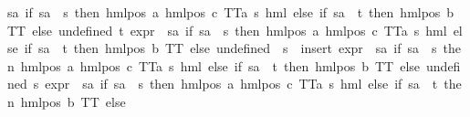 \begin{isabellebody}
{\isacharparenleft}{\kern0pt}{\isasymlambda}sa{\isachardot}{\kern0pt}\ if\ sa\ {\isacharequal}{\kern0pt}\ s\ then\ hml{\isacharunderscore}{\kern0pt}pos\ a\ {\isacharparenleft}{\kern0pt}hml{\isacharunderscore}{\kern0pt}pos\ c\ {\isacharparenleft}{\kern0pt}TT{\isacharcolon}{\kern0pt}{\isacharcolon}{\kern0pt}{\isacharparenleft}{\kern0pt}{\isacharprime}{\kern0pt}a{\isacharcomma}{\kern0pt}\ {\isacharprime}{\kern0pt}s{\isacharparenright}{\kern0pt}\ hml{\isacharparenright}{\kern0pt}{\isacharparenright}{\kern0pt}\ else\ if\ sa\ {\isacharequal}{\kern0pt}\ t\ then\ hml{\isacharunderscore}{\kern0pt}pos\ b\ TT\ else\ undefined{\isacharparenright}{\kern0pt}{\isacharparenright}{\kern0pt}\ t{\isacharparenright}{\kern0pt}\ {\isacharparenleft}{\kern0pt}{\isacharparenleft}{\kern0pt}expr{\isacharunderscore}{\kern0pt}{}\ {\isasymcirc}\ {\isacharparenleft}{\kern0pt}{\isasymlambda}sa{\isachardot}{\kern0pt}\ if\ sa\ {\isacharequal}{\kern0pt}\ s\ then\ hml{\isacharunderscore}{\kern0pt}pos\ a\ {\isacharparenleft}{\kern0pt}hml{\isacharunderscore}{\kern0pt}pos\ c\ {\isacharparenleft}{\kern0pt}TT{\isacharcolon}{\kern0pt}{\isacharcolon}{\kern0pt}{\isacharparenleft}{\kern0pt}{\isacharprime}{\kern0pt}a{\isacharcomma}{\kern0pt}\ {\isacharprime}{\kern0pt}s{\isacharparenright}{\kern0pt}\ hml{\isacharparenright}{\kern0pt}{\isacharparenright}{\kern0pt}\ else\ if\ sa\ {\isacharequal}{\kern0pt}\ t\ then\ hml{\isacharunderscore}{\kern0pt}pos\ b\ TT\ else\ undefined{\isacharparenright}{\kern0pt}{\isacharparenright}{\kern0pt}\ {\isacharbackquote}{\kern0pt}\ {\isacharbraceleft}{\kern0pt}s{\isacharbraceright}{\kern0pt}{\isacharparenright}{\kern0pt}\ {\isasymunion}\ insert\ {\isacharparenleft}{\kern0pt}{\isacharparenleft}{\kern0pt}expr{\isacharunderscore}{\kern0pt}{}\ {\isasymcirc}\ {\isacharparenleft}{\kern0pt}{\isasymlambda}sa{\isachardot}{\kern0pt}\ if\ sa\ {\isacharequal}{\kern0pt}\ s\ then\ hml{\isacharunderscore}{\kern0pt}pos\ a\ {\isacharparenleft}{\kern0pt}hml{\isacharunderscore}{\kern0pt}pos\ c\ {\isacharparenleft}{\kern0pt}TT{\isacharcolon}{\kern0pt}{\isacharcolon}{\kern0pt}{\isacharparenleft}{\kern0pt}{\isacharprime}{\kern0pt}a{\isacharcomma}{\kern0pt}\ {\isacharprime}{\kern0pt}s{\isacharparenright}{\kern0pt}\ hml{\isacharparenright}{\kern0pt}{\isacharparenright}{\kern0pt}\ else\ if\ sa\ {\isacharequal}{\kern0pt}\ t\ then\ hml{\isacharunderscore}{\kern0pt}pos\ b\ TT\ else\ undefined{\isacharparenright}{\kern0pt}{\isacharparenright}{\kern0pt}\ s{\isacharparenright}{\kern0pt}\ {\isacharparenleft}{\kern0pt}{\isacharparenleft}{\kern0pt}expr{\isacharunderscore}{\kern0pt}{}\ {\isasymcirc}\ {\isacharparenleft}{\kern0pt}{\isasymlambda}sa{\isachardot}{\kern0pt}\ if\ sa\ {\isacharequal}{\kern0pt}\ s\ then\ hml{\isacharunderscore}{\kern0pt}pos\ a\ {\isacharparenleft}{\kern0pt}hml{\isacharunderscore}{\kern0pt}pos\ c\ {\isacharparenleft}{\kern0pt}TT{\isacharcolon}{\kern0pt}{\isacharcolon}{\kern0pt}{\isacharparenleft}{\kern0pt}{\isacharprime}{\kern0pt}a{\isacharcomma}{\kern0pt}\ {\isacharprime}{\kern0pt}s{\isacharparenright}{\kern0pt}\ hml{\isacharparenright}{\kern0pt}{\isacharparenright}{\kern0pt}\ else\ if\ sa\ {\isacharequal}{\kern0pt}\ t\ then\ hml{\isacharunderscore}{\kern0pt}pos\ b\ TT\ else\ 
\end{isabellebody}
